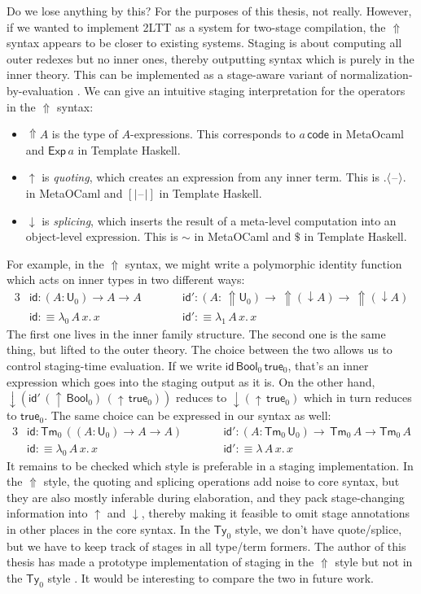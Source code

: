\documentclass[12pt,a4paper,twoside,openany]{book}
\theoremstyle{remark}
\theoremstyle{definition}
\theoremstyle{theorem}
\newcommand{\ms}[1]{\mathsf{#1}}
\newcommand{\id}{\mathsf{id}}
\newcommand{\Tm}{\mathsf{Tm}}
\newcommand{\Ty}{\mathsf{Ty}}
\newcommand{\U}{\mathsf{U}}
\newcommand{\blank}{\mathord{\hspace{1pt}\text{--}\hspace{1pt}}}
\newcommand{\Lift}{\Uparrow}
\newcommand{\Bool}{\ms{Bool}}
\newcommand{\true}{\ms{true}}
\newcommand{\up}{\uparrow}
\newcommand{\down}{\downarrow}
\newcommand{\lab}{\langle}
\newcommand{\rab}{\rangle}
\newcommand{\defn}{:\equiv}
\begin{document}
Do we lose anything by this? For the purposes of this thesis, not
really. However, if we wanted to implement 2LTT as a system for two-stage
compilation, the $\Lift$ syntax appears to be closer to existing systems.
Staging is about computing all outer redexes but no inner ones, thereby
outputting syntax which is purely in the inner theory. This can be implemented
as a stage-aware variant of normalization-by-evaluation \cite{TODO}. We can give
an intuitive staging interpretation for the operators in the $\Lift$ syntax:
\begin{itemize}
\item
  $\Lift\!A$ is the type of $A$-expressions. This corresponds to $a\,\ms{code}$
  in MetaOcaml \cite{TODO} and $\ms{Exp}\,a$ in Template Haskell.
\item
  $\up$ is \emph{quoting}, which creates an expression from any inner term. This is
  $.\lab\blank\rab.$ in MetaOCaml and $[|\blank|]$ in Template Haskell.
\item $\down$ is \emph{splicing}, which inserts the result of a meta-level computation into
  an object-level expression. This is $\sim$ in MetaOCaml and $\$$ in Template Haskell.
\end{itemize}
For example, in the $\Lift$ syntax, we might write a polymorphic identity function
which acts on inner types in two different ways:
\begin{alignat*}{3}
  &\id : (A : \U_0) \to A \to A\hspace{2em} && \id' : (A :\,\Lift\!\U_0) \to\,\Lift\!(\down A) \to\,\Lift\!(\down A)\\
  &\id \defn \lambda_0\,A\,x.\,x && \id' \defn \lambda_1\,A\,x.\,x
\end{alignat*}
The first one lives in the inner family structure. The second one is the same
thing, but lifted to the outer theory. The choice between the two allows us to
control staging-time evaluation. If we write $\id\,\Bool_0\,\true_0$, that's an
inner expression which goes into the staging output as it is. On the other hand,
$\down(\id'\,(\up\,\Bool_0)\,(\up\,\true_0))$ reduces to $\down(\up\,\true_0)$
which in turn reduces to $\true_0$. The same choice can be expressed in our
syntax as well:
\begin{alignat*}{3}
  &\id : \Tm_0\,((A : \U_0) \to A \to A)\hspace{2em}&&\id' : (A : \Tm_0\,\U_0) \to\,\Tm_0\,A \to \Tm_0\,A\\
  &\id \defn \lambda_0\,A\,x.\,x &&\id' \defn \lambda\,A\,x.\,x
\end{alignat*}
It remains to be checked which style is preferable in a staging
implementation. In the $\Lift$ style, the quoting and splicing operations add
noise to core syntax, but they are also mostly inferable during elaboration, and
they pack stage-changing information into $\up$ and $\down$, thereby making it
feasible to omit stage annotations in other places in the core syntax. In the
$\Ty_0$ style, we don't have quote/splice, but we have to keep track of stages
in all type/term formers. The author of this thesis has made a prototype
implementation of staging in the $\Lift$ style but not in the $\Ty_0$ style
\cite{TODO}. It would be interesting to compare the two in future work.
\end{document}
